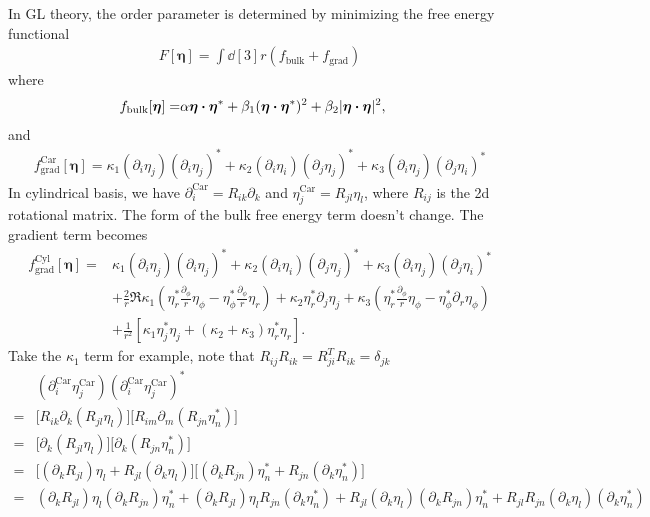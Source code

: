 \documentclass[aps,prl,preprint]{revtex4-2}
\begin{document}
In GL theory, the order parameter is determined by minimizing the free energy functional
\begin{align}
    F[\bm{\eta}]=\int\dd[3]r\left(f_{\text{bulk}}+f_{\text{grad}}\right)
\end{align}
where
\begin{align}
    f_{\text{bulk}}[\bm{\eta}]= & \alpha\bm{\eta}\vdot\bm{\eta}^*
    +\beta_1(\bm{\eta}\vdot\bm{\eta}^*)^2
    +\beta_2|\bm{\eta}\vdot\bm{\eta}|^2,
\end{align}
and
\begin{align}
    f^{\text{Car}}_{\text{grad}}[\bm{\eta}]=\kappa_1(\partial_i\eta_j)(\partial_i\eta_j)^*
    +\kappa_2(\partial_i\eta_i)(\partial_j\eta_j)^*
    +\kappa_3(\partial_i\eta_j)(\partial_j\eta_i)^*
\end{align}
In cylindrical basis, we have $\partial_i^\text{Car}=R_{ik}\partial_k$
and $\eta_j^\text{Car}=R_{jl}\eta_l$, where $R_{ij}$ is the 2d rotational matrix.
The form of the bulk free energy term doesn't change.
The gradient term becomes
\begin{align}
    f^{\text{Cyl}}_{\text{grad}}[\bm{\eta}]= & \kappa_1(\partial_i\eta_j)(\partial_i\eta_j)^*
    +\kappa_2(\partial_i\eta_i)(\partial_j\eta_j)^*
    +\kappa_3(\partial_i\eta_j)(\partial_j\eta_i)^*\nonumber                                  \\
                                             & +\frac{2}{r}\Re{
        \kappa_1\left(\eta_r^*\frac{\partial_\phi}{r}\eta_\phi
        -\eta_\phi^*\frac{\partial_\phi}{r}\eta_r\right)
        +\kappa_2\eta_r^*\partial_j\eta_j
        +\kappa_3\left(\eta_r^*\frac{\partial_\phi}{r}\eta_\phi
    -\eta_\phi^*\partial_r\eta_\phi\right)}\nonumber                                          \\
                                             & +\frac{1}{r^2}\left[\kappa_1\eta^*_j\eta_j
        +(\kappa_2+\kappa_3)\eta_r^*\eta_r\right].
\end{align}
Take the $\kappa_1$ term for example, note that $R_{ij}R_{ik}=R^T_{ji}R_{ik}=\delta_{jk}$
\begin{align}
      & (\partial_i^{\text{Car}}\eta_j^{\text{Car}})(\partial_i^{\text{Car}}\eta_j^{\text{Car}})^* \\
    = & \bigg[R_{ik}\partial_k(R_{jl}\eta_l)\bigg]\bigg[R_{im}\partial_m(R_{jn}\eta_n^*)\bigg]     \\
    = & \bigg[\partial_k(R_{jl}\eta_l)\bigg]\bigg[\partial_k(R_{jn}\eta_n^*)\bigg]                 \\
    = & \bigg[(\partial_kR_{jl})\eta_l + R_{jl}(\partial_k\eta_l)\bigg]
    \bigg[(\partial_k R_{jn})\eta_n^* + R_{jn}(\partial_k\eta_n^*)\bigg]                           \\
    = & (\partial_k R_{jl})\eta_l (\partial_k R_{jn})\eta_n^*
    +(\partial_k R_{jl})\eta_l R_{jn}(\partial_k\eta_n^*)
    +R_{jl}(\partial_k\eta_l) (\partial_k R_{jn})\eta_n^*
    +R_{jl}R_{jn}(\partial_k\eta_l)(\partial_k \eta_n^*)\nonumber
\end{align}
\end{document}

